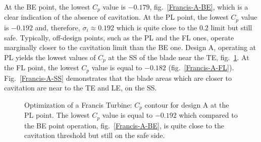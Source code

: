 At the BE point, the lowest $C_p$ value is $-0.179$, fig.\ \ref{Francis-A-BE}, which is a clear indication of the absence of cavitation.
At the PL point, the lowest $C_p$ value is $-0.192$ and, therefore, $\sigma_i \approx 0.192$ which is quite close to the $0.2$ limit but still safe. Typically, off-design points, such as the PL and the FL ones, operate marginally closer to the cavitation limit than the BE one. Design A, operating at PL yields the lowest values of $C_p$ at the SS of the blade near the TE, fig.\ \ref{Francis-A-PL}.  
At the FL point, the lowest  $C_p$ value is equal to $-0.182$ (fig.\ \ref{Francis-A-FL}). Fig.\ \ref{Francis-A-SS} demonstrates that the blade areas which are closer to cavitation are near to the TE and LE, on the SS. 

 
\begin{figure}[h!]
\begin{minipage}[b]{1\linewidth}
 \centering
\end{minipage}
\caption{Optimization of a Francis Turbine: $C_p$ contour for design A at the PL point. The lowest $C_p$ value is equal to $-0.192$ which compared to the BE point operation, fig.\ \ref{Francis-A-BE}, is quite close to the cavitation threshold but still on the safe side.}
\label{Francis-A-PL}
\end{figure}



